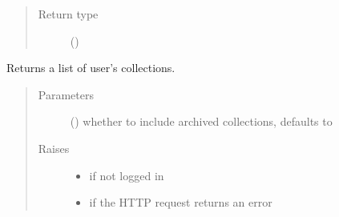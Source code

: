 \documentclass[letterpaper,10pt,english]{sphinxmanual}
\begin{document}
\begin{fulllineitems}
\begin{fulllineitems}
\begin{quote}
\begin{description}
\item[{Return type}] \leavevmode
\sphinxAtStartPar
{}()

\end{description}\end{quote}

\end{fulllineitems}


\begin{fulllineitems}
\label{\detokenize{autoapi/pine/client/client/index:pine.client.client.PineClient.list_collections}}
\sphinxAtStartPar
Returns a list of user’s collections.
\begin{quote}\begin{description}
\item[{Parameters}] \leavevmode
\sphinxAtStartPar
{} () \textendash{} whether to include archived collections, defaults to 

\item[{Raises}] \leavevmode\begin{itemize}
\item {} 
\sphinxAtStartPar
{\hyperref[\detokenize{autoapi/pine/client/exceptions/index:pine.client.exceptions.PineClientAuthException}]{}} \textendash{} if not logged in

\item {} 
\sphinxAtStartPar
{\hyperref[\detokenize{autoapi/pine/client/exceptions/index:pine.client.exceptions.PineClientHttpException}]{}} \textendash{} if the HTTP request returns an error


\end{itemize}
\end{description}
\end{quote}
\end{fulllineitems}
\end{fulllineitems}
\end{document}
